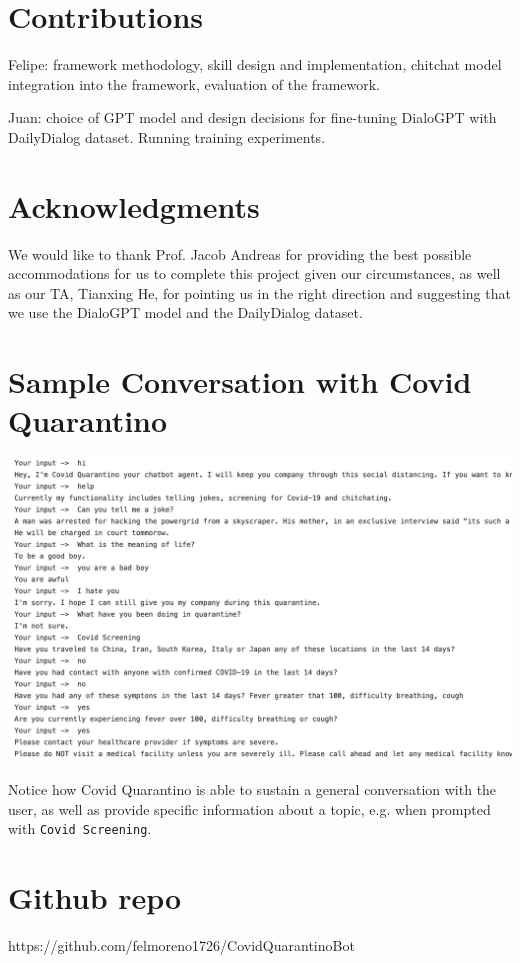 \documentclass[11pt,a4paper]{article}
\begin{document}
\section{Contributions}
Felipe: framework methodology, skill design and implementation, chitchat model integration into the framework, evaluation of the framework.

Juan: choice of GPT model and design decisions for fine-tuning DialoGPT with DailyDialog dataset. Running training experiments.

\section*{Acknowledgments}

We would like to thank Prof. Jacob Andreas for providing the best possible accommodations for us to complete this project given our circumstances, as well as our TA, Tianxing He, for pointing us in the right direction and suggesting that we use the DialoGPT model and the DailyDialog dataset.




\appendix

\section{Sample Conversation with Covid Quarantino}
\label{sec:appendix}

\includegraphics[scale=0.5]{conversation.png}

Notice how Covid Quarantino is able to sustain a general conversation with the user, as well as provide specific information about a topic, e.g. when prompted with \texttt{Covid Screening}.

\section{Github repo}
https://github.com/felmoreno1726/CovidQuarantinoBot
\end{document}
